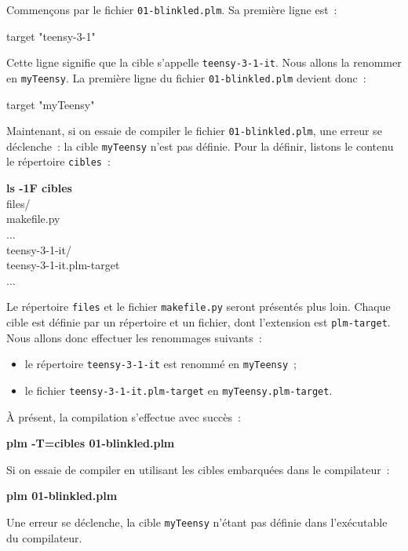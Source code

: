 Commençons par le fichier \texttt{01-blinkled.plm}. Sa première ligne est~:

\begin{PLM}[1]
target "teensy-3-1"
\end{PLM}

Cette ligne signifie que la cible s'appelle \texttt{teensy-3-1-it}. Nous allons la renommer en \texttt{myTeensy}. La première ligne du fichier \texttt{01-blinkled.plm} devient donc~:

\begin{PLM}[1]
target "myTeensy"
\end{PLM}

Maintenant, si on essaie de compiler le fichier \texttt{01-blinkled.plm}, une erreur se déclenche~: la cible \texttt{myTeensy} n'est pas définie. Pour la définir, listons le contenu le répertoire \texttt{cibles}~:
\begin{SHELL}
{\bfseries ls -1F cibles}\\
files/\\
makefile.py\\
...\\
teensy-3-1-it/\\
teensy-3-1-it.plm-target\\
...
\end{SHELL}

Le répertoire \texttt{files} et le fichier \texttt{makefile.py} seront présentés plus loin. Chaque cible est définie par un répertoire et un fichier, dont l'extension est \texttt{plm-target}. Nous allons donc effectuer les renommages suivants~:
\begin{itemize}
  \item le répertoire \texttt{teensy-3-1-it} est renommé en \texttt{myTeensy}~;
  \item le fichier \texttt{teensy-3-1-it.plm-target} en \texttt{myTeensy.plm-target}.
\end{itemize}

À présent, la compilation s'effectue avec succès~:
\begin{SHELL}
\bfseries plm -T=cibles 01-blinkled.plm
\end{SHELL}

Si on essaie de compiler en utilisant les cibles embarquées dans le compilateur~:
\begin{SHELL}
\bfseries plm 01-blinkled.plm
\end{SHELL}

Une erreur se déclenche, la cible \texttt{myTeensy} n'étant pas définie dans l'exécutable du compilateur.






